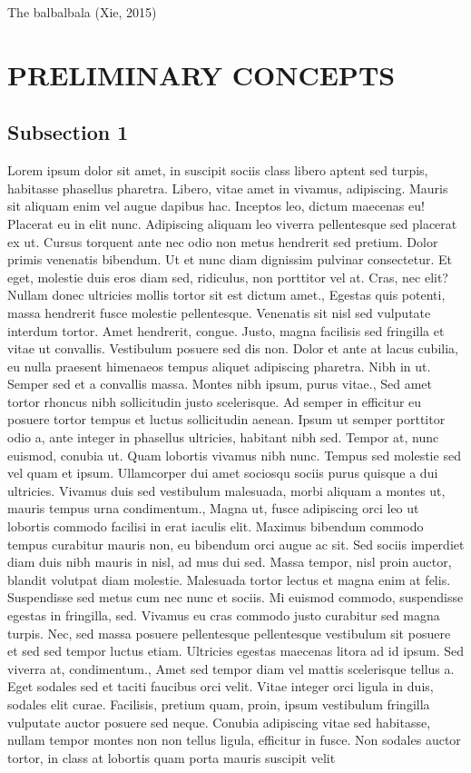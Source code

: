 \documentclass{source/tex/templates/maththesis}
\begin{document}
The balbalbala (Xie, 2015)

\hypertarget{preliminary-concepts}{%
\chapter{PRELIMINARY CONCEPTS}\label{preliminary-concepts}}

\hypertarget{subsection-1-1}{%
\section{Subsection 1}\label{subsection-1-1}}

Lorem ipsum dolor sit amet, in suscipit sociis class libero aptent sed turpis, habitasse phasellus pharetra. Libero, vitae amet in vivamus, adipiscing. Mauris sit aliquam enim vel augue dapibus hac. Inceptos leo, dictum maecenas eu! Placerat eu in elit nunc. Adipiscing aliquam leo viverra pellentesque sed placerat ex ut. Cursus torquent ante nec odio non metus hendrerit sed pretium. Dolor primis venenatis bibendum. Ut et nunc diam dignissim pulvinar consectetur. Et eget, molestie duis eros diam sed, ridiculus, non porttitor vel at. Cras, nec elit? Nullam donec ultricies mollis tortor sit est dictum amet., Egestas quis potenti, massa hendrerit fusce molestie pellentesque. Venenatis sit nisl sed vulputate interdum tortor. Amet hendrerit, congue. Justo, magna facilisis sed fringilla et vitae ut convallis. Vestibulum posuere sed dis non. Dolor et ante at lacus cubilia, eu nulla praesent himenaeos tempus aliquet adipiscing pharetra. Nibh in ut. Semper sed et a convallis massa. Montes nibh ipsum, purus vitae., Sed amet tortor rhoncus nibh sollicitudin justo scelerisque. Ad semper in efficitur eu posuere tortor tempus et luctus sollicitudin aenean. Ipsum ut semper porttitor odio a, ante integer in phasellus ultricies, habitant nibh sed. Tempor at, nunc euismod, conubia ut. Quam lobortis vivamus nibh nunc. Tempus sed molestie sed vel quam et ipsum. Ullamcorper dui amet sociosqu sociis purus quisque a dui ultricies. Vivamus duis sed vestibulum malesuada, morbi aliquam a montes ut, mauris tempus urna condimentum., Magna ut, fusce adipiscing orci leo ut lobortis commodo facilisi in erat iaculis elit. Maximus bibendum commodo tempus curabitur mauris non, eu bibendum orci augue ac sit. Sed sociis imperdiet diam duis nibh mauris in nisl, ad mus dui sed. Massa tempor, nisl proin auctor, blandit volutpat diam molestie. Malesuada tortor lectus et magna enim at felis. Suspendisse sed metus cum nec nunc et sociis. Mi euismod commodo, suspendisse egestas in fringilla, sed. Vivamus eu cras commodo justo curabitur sed magna turpis. Nec, sed massa posuere pellentesque pellentesque vestibulum sit posuere et sed sed tempor luctus etiam. Ultricies egestas maecenas litora ad id ipsum. Sed viverra at, condimentum., Amet sed tempor diam vel mattis scelerisque tellus a. Eget sodales sed et taciti faucibus orci velit. Vitae integer orci ligula in duis, sodales elit curae. Facilisis, pretium quam, proin, ipsum vestibulum fringilla vulputate auctor posuere sed neque. Conubia adipiscing vitae sed habitasse, nullam tempor montes non non tellus ligula, efficitur in fusce. Non sodales auctor tortor, in class at lobortis quam porta mauris suscipit velit 
\end{document}
